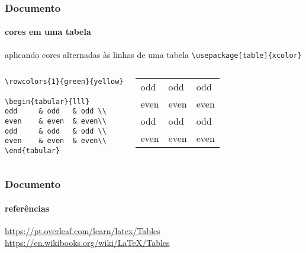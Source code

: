 \begin{frame}[fragile]
\frametitle{Documento}
\framesubtitle{cores em uma tabela}
  \scriptsize 
  aplicando cores alternadas às linhas de uma tabela \verb|\usepackage[table]{xcolor}|
  \begin{columns}[c]
  \vspace{-0.2cm}
  \scriptsize
  \begin{verbatim}
\rowcolors{1}{green}{yellow}

\begin{tabular}{lll}
odd     & odd   & odd \\
even    & even  & even\\
odd     & odd   & odd \\
even    & even  & even\\
\end{tabular}
  \end{verbatim}
  \begin{fmpage}{\textwidth}

\begin{tabular}{lll}
odd     & odd   & odd \\
even    & even  & even\\
odd     & odd   & odd \\
even    & even  & even\\
\end{tabular}
  \end{fmpage}
  \end{columns}
\end{frame}


\begin{frame}[fragile]
\frametitle{Documento}
\framesubtitle{referências}
\url{https://pt.overleaf.com/learn/latex/Tables}
\url{https://en.wikibooks.org/wiki/LaTeX/Tables}
\end{frame}


